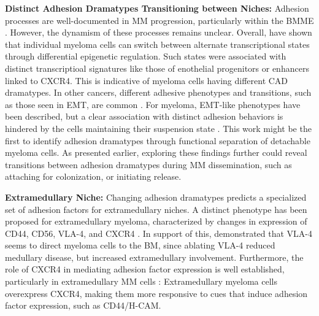 \textbf{Distinct Adhesion Dramatypes Transitioning between Niches:}
Adhesion processes are well-documented in MM progression, particularly within
the \ac{BMME} \cite{bouzerdanAdhesionMoleculesMultiple2022}. However, the
dynamism of these processes remains unclear. Overall,
\citet{fredeDynamicTranscriptionalReprogramming2021} have shown that individual
myeloma cells can switch between alternate transcriptional states through
differential epigenetic regulation. Such states were associated with distinct
transcriptioal signatures like those of enothelial progenitors or enhancers
linked to CXCR4. This is indicative of myeloma cells having different \ac{CAD}
dramatypes. In other cancers, different adhesive phenotypes and transitions,
such as those seen in \ac{EMT}, are common
\cite{gengDynamicSwitchTwo2014}. For myeloma, EMT-like phenotypes have been
described, but a clear association with distinct adhesion behaviors is hindered
by the cells maintaining their suspension state
\cite{roccaroCXCR4RegulatesExtraMedullary2015,
      qianSETDB1InducesLenalidomide2023}. This work might be the first to identify
adhesion dramatypes through functional separation of detachable myeloma cells.
As presented earlier, exploring these findings further could reveal transitions
between adhesion dramatypes during MM dissemination, such as attaching for
colonization, or initiating release.


\textbf{Extramedullary Niche:}
Changing adhesion dramatypes predicts a specialized set of adhesion factors for
extramedullary niches. A distinct phenotype has been proposed for extramedullary
myeloma, characterized by changes in
expression of CD44, CD56, VLA-4, and CXCR4
\cite{guptaExtramedullaryMultipleMyeloma2022}. In support of this,
\cite{hathiAblationVLA4Multiple2022} demonstrated that VLA-4 seems to direct
myeloma cells to the BM, since ablating VLA-4 reduced medullary disease, but
increased extramedullary involvement. Furthermore, the role of CXCR4 in
mediating adhesion factor expression is well established, particularly in
extramedullary MM cells \cite{roccaroCXCR4RegulatesExtraMedullary2015,
      guptaExtramedullaryMultipleMyeloma2022}: Extramedullary myeloma cells
overexpress CXCR4, making them more responsive to cues that induce adhesion
factor expression, such as CD44/H-CAM.



